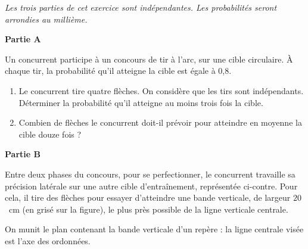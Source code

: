 \documentclass[12pt,french]{article}
\begin{document}
\begin{question}[subtitle={Asie 2015}]
\emph{Les trois parties de cet exercice sont indépendantes. Les probabilités seront arrondies au millième.}

\bigskip

\textbf{Partie A}

\medskip

Un concurrent participe à un concours de tir à l'arc, sur une cible circulaire.
À chaque tir, la probabilité qu'il atteigne la cible est égale à $0$,8.

\medskip

\begin{enumerate}
  \item Le concurrent tire quatre flèches. On considère que les tirs sont
    indépendants.
    Déterminer la probabilité qu'il atteigne au moins trois fois la cible.
  \item Combien de flèches le concurrent doit-il prévoir pour atteindre en
    moyenne la cible douze fois ?
\end{enumerate}

\bigskip

\textbf{Partie B}

\medskip

\parbox{0.65\linewidth}{Entre deux phases du concours, pour se
  perfectionner, le concurrent travaille sa précision latérale sur une autre
  cible d'entraînement, représentée ci-contre. Pour cela, il tire des
  flèches pour essayer d'atteindre une bande verticale, de largeur $20$~cm
  (en grisé sur la figure), le plus près possible de la ligne verticale
  centrale.

  On munit le plan contenant la bande verticale d'un repère : la ligne
  centrale visée est l'axe des
  ordonnées.

}
\end{question}
\end{document}
